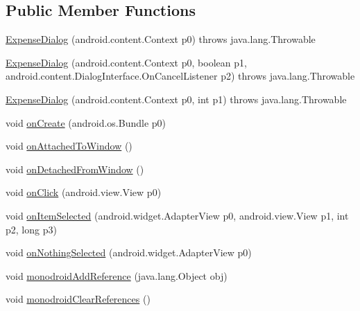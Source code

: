 \subsection*{Public Member Functions}
\begin{DoxyCompactItemize}
\item 
\hyperlink{classfieldservice_1_1android_1_1dialogs_1_1_expense_dialog_a6e84d3538b5077683c77b9ddcf8a795c}{Expense\+Dialog} (android.\+content.\+Context p0)  throws java.\+lang.\+Throwable 	
\item 
\hyperlink{classfieldservice_1_1android_1_1dialogs_1_1_expense_dialog_ad80e9887e0a0f6a5ae25a997bb7b1ae2}{Expense\+Dialog} (android.\+content.\+Context p0, boolean p1, android.\+content.\+Dialog\+Interface.\+On\+Cancel\+Listener p2)  throws java.\+lang.\+Throwable 	
\item 
\hyperlink{classfieldservice_1_1android_1_1dialogs_1_1_expense_dialog_ab5cf78b20312029146bf3fde527c49ed}{Expense\+Dialog} (android.\+content.\+Context p0, int p1)  throws java.\+lang.\+Throwable 	
\item 
void \hyperlink{classfieldservice_1_1android_1_1dialogs_1_1_expense_dialog_a1e759ee5567b60f94ebd00b14716f23c}{on\+Create} (android.\+os.\+Bundle p0)
\item 
void \hyperlink{classfieldservice_1_1android_1_1dialogs_1_1_expense_dialog_a4cbfb0b17218011bc0364052361719e7}{on\+Attached\+To\+Window} ()
\item 
void \hyperlink{classfieldservice_1_1android_1_1dialogs_1_1_expense_dialog_a445bebbce5bc10a3f12eb618ca6020f1}{on\+Detached\+From\+Window} ()
\item 
void \hyperlink{classfieldservice_1_1android_1_1dialogs_1_1_expense_dialog_a3c977c4f0020f0301700ee9c1f2afdba}{on\+Click} (android.\+view.\+View p0)
\item 
void \hyperlink{classfieldservice_1_1android_1_1dialogs_1_1_expense_dialog_aa0ac49df63520cc5c86af0e6238a4f49}{on\+Item\+Selected} (android.\+widget.\+Adapter\+View p0, android.\+view.\+View p1, int p2, long p3)
\item 
void \hyperlink{classfieldservice_1_1android_1_1dialogs_1_1_expense_dialog_a36db5f6458dc6d5bd37bc361fe19d779}{on\+Nothing\+Selected} (android.\+widget.\+Adapter\+View p0)
\item 
void \hyperlink{classfieldservice_1_1android_1_1dialogs_1_1_expense_dialog_af335d38de0a4f75669ec40339a763e5a}{monodroid\+Add\+Reference} (java.\+lang.\+Object obj)
\item 
void \hyperlink{classfieldservice_1_1android_1_1dialogs_1_1_expense_dialog_a88ff139c1f0987ddf2ea0238d2eefef4}{monodroid\+Clear\+References} ()
\end{DoxyCompactItemize}



